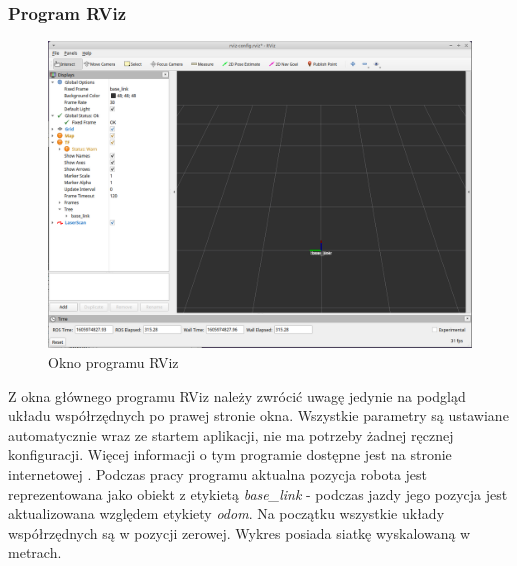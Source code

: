 \subsubsection{Program RViz}
\begin{figure}[ht]
	\centering
		\includegraphics[width=1\linewidth]{rys/main-app-view-4.PNG}
	\caption{Okno programu RViz}
	\label{fig:rviz-window}
\end{figure}

Z okna głównego programu RViz należy zwrócić uwagę jedynie na podgląd układu współrzędnych po prawej stronie okna. Wszystkie parametry są ustawiane automatycznie wraz ze startem aplikacji, nie ma potrzeby żadnej ręcznej konfiguracji. Więcej informacji o tym programie dostępne jest na stronie internetowej \cite{rviz}.
Podczas pracy programu aktualna pozycja robota jest reprezentowana jako obiekt z etykietą \emph{base\_link} - podczas jazdy jego pozycja jest aktualizowana względem etykiety \emph{odom}. Na początku wszystkie układy współrzędnych są w pozycji zerowej. Wykres posiada siatkę wyskalowaną w metrach.

